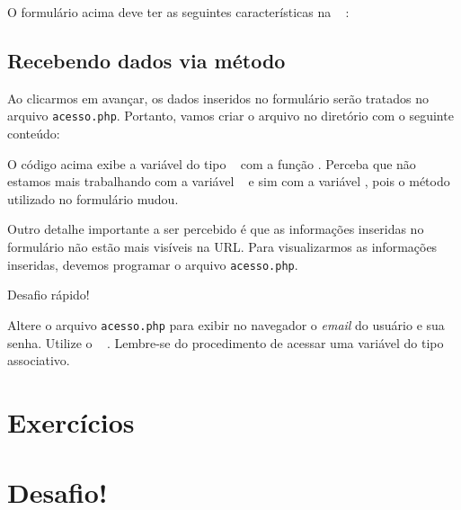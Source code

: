 O formulário acima deve ter as seguintes características na \tag~ \tagform:



\subsection{Recebendo dados via método \metodoPOST}
\label{recebendo-dados-via-metodo-post}

Ao clicarmos em avançar, os dados inseridos no formulário serão tratados no arquivo
\texttt{acesso.php}. Portanto, vamos criar o arquivo no diretório 
com o seguinte conteúdo:



O código acima exibe a variável do tipo \tipoarray~ com a função \funcaoprintr.
Perceba que não estamos mais trabalhando com a variável \variavelget~ e sim com a
variável \variavelpost, pois o método utilizado no formulário mudou.

Outro detalhe importante a ser percebido é que as informações inseridas no
formulário não estão mais visíveis na URL. Para visualizarmos as informações
inseridas, devemos programar o arquivo \texttt{acesso.php}.

\begin{framed}
{\Large Desafio rápido!}

Altere o arquivo \texttt{acesso.php} para exibir no navegador o \textit{email} do usuário
e sua senha. Utilize o \tipoarray~ \variavelpost. Lembre-se do procedimento de acessar uma 
variável do tipo \tipoarray~ associativo.
\end{framed}


\section{Exercícios}
\label{cap7-exercicios}

\section{Desafio!}
\label{cap7-desafio}